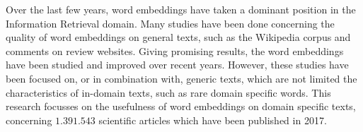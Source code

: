 \documentclass[../../Thesis.tex]{subfiles}
\begin{document}
Over the last few years, word embeddings have taken a dominant position in the Information Retrieval domain. Many studies have been done concerning the quality of word embeddings on general texts, such as the Wikipedia corpus and comments on review websites. Giving promising results, the word embeddings have been studied and improved over recent years. However, these studies have been focused on, or in combination with, generic texts, which are not limited the characteristics of in-domain texts, such as rare domain specific words. This research focusses on the usefulness of word embeddings on domain specific texts, concerning $1.391.543$ scientific articles which have been published in 2017.
\end{document}
